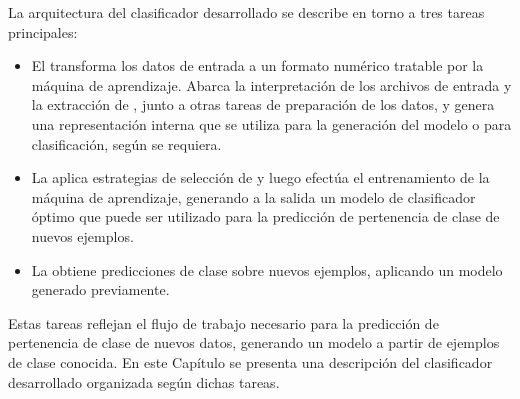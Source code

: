 %
%
%
%

La arquitectura del clasificador desarrollado se describe en torno a
tres tareas principales:
%
\begin{itemize}
\item
  El  transforma los datos de entrada a un formato
  numérico tratable por la máquina de aprendizaje.
  Abarca la interpretación de los archivos de entrada y la extracción
  de , junto a otras tareas de preparación de los datos, y
  genera una representación interna que se utiliza para la generación
  del modelo o para clasificación, según se requiera.
\item
  La  aplica estrategias de
  selección de  y luego efectúa el entrenamiento de la
  máquina de aprendizaje, generando a la salida un modelo de
  clasificador óptimo que puede ser utilizado para la predicción de
  pertenencia de clase de nuevos ejemplos.
\item
  La  obtiene predicciones de clase sobre nuevos
  ejemplos, aplicando un modelo generado previamente.
\end{itemize}
%
Estas tareas reflejan el flujo de trabajo necesario para la predicción
de pertenencia de clase de nuevos datos, generando un modelo a partir
de ejemplos de clase conocida.
En este Capítulo se presenta una descripción del clasificador
desarrollado organizada según dichas tareas.
